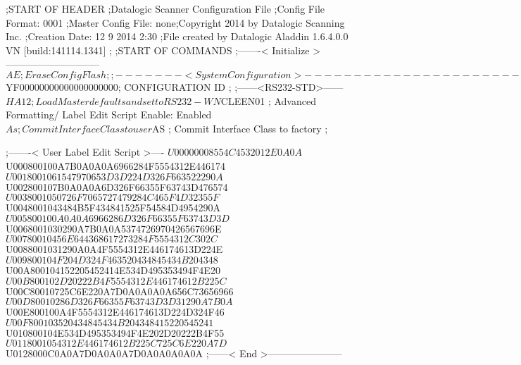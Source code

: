 ;START OF HEADER
;Datalogic Scanner Configuration File
;Config File Format: 0001
;Master Config File: none;Copyright 2014 by Datalogic Scanning Inc.
;Creation Date: 12 9 2014 2:30
;File created by Datalogic Aladdin 1.6.4.0.0 VN [build:141114.1341]
;
;START OF COMMANDS
;-------< Initialize >-----------------------------
$AE                 ; Erase Config Flash
;
;-------< System Configuration >-------------------------------
$YF00000000000000000000; CONFIGURATION ID
;
;------<RS232-STD>------
$HA12               ; Load Master defaults and set to RS232-WN
$CLEEN01            ; Advanced Formatting/ Label Edit Script Enable: Enabled
$As                 ; Commit Interface Class to user
$AS                 ; Commit Interface Class to factory
;

;-------< User Label Edit Script >----
$U00000008554C4532012E0A0A
$U000800100A7B0A0A0A6966284F5554312E446174
$U0018001061547970653D3D224D326F663522290A
$U002800107B0A0A0A6D326F66355F63743D476574
$U0038001050726F7065727479284C465F4D32355F
$U0048001043484B5F434841525F54584D4954290A
$U005800100A0A0A6966286D326F66355F63743D3D
$U0068001030290A7B0A0A5374726970426567696E
$U00780010456E644368617273284F5554312C302C
$U0088001031290A0A4F5554312E446174613D224E
$U009800104F204D324F463520434845434B204348
$U00A800104152205452414E534D495353494F4E20
$U00B800102D20222B4F5554312E446174612B225C
$U00C80010725C6E220A7D0A0A0A0A656C73656966
$U00D80010286D326F66355F63743D3D31290A7B0A
$U00E800100A4F5554312E446174613D224D324F46
$U00F800103520434845434B204348415220545241
$U010800104E534D495353494F4E202D20222B4F55
$U0118001054312E446174612B225C725C6E220A7D
$U0128000C0A0A7D0A0A0A7D0A0A0A0A0A
;------< End >-----------------------
